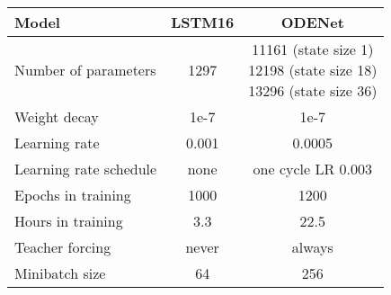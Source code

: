 \begin{tabular}{@{}l|c c @{}}
\toprule
Model & LSTM16 & ODENet \\ \midrule %
Number of   parameters & 1297 & \makecell{11161 (state size 1)\\12198 (state size 18)\\13296 (state size 36)} \\
Weight decay & 1e-7 & 1e-7             \\
Learning rate & 0.001 & 0.0005            \\
Learning rate schedule & none & one cycle LR 0.003      \\
Epochs in training & 1000 & 1200            \\
Hours in training & 3.3 & 22.5           \\
Teacher forcing & never & always       \\ 
Minibatch size & 64 &   256  \\ \bottomrule
\end{tabular}%
